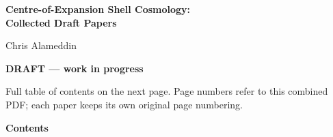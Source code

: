 \documentclass[11pt,a4paper]{article}
\begin{document}
\pagestyle{empty}
\begin{center}\vspace*{3cm}
{\LARGE\bfseries Centre-of-Expansion Shell Cosmology:\\[4pt] Collected Draft Papers\par}\vspace{1.5cm}
{\Large Chris Alameddin\par}\vspace{0.5cm}{\large October 2026\par}\vspace{0.8cm}
{\large\bfseries DRAFT --- work in progress\par}\vspace{2.5cm}\end{center}
\noindent\small Full table of contents on the next page. Page numbers refer to this combined PDF; each paper keeps its own original page numbering.
\clearpage
{}
{\noindent\Large\bfseries Contents\par}\medskip
\end{document}
